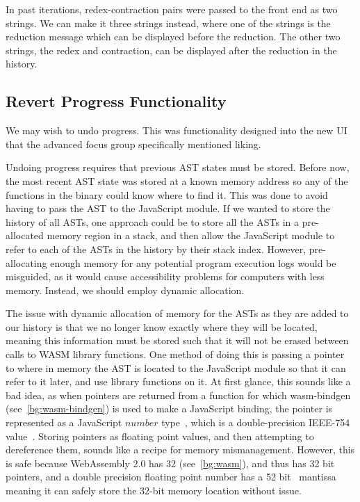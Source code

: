 In past iterations, redex-contraction pairs were passed to the front end as two strings. We can make it three strings instead, where one of the strings is the reduction message which can be displayed before the reduction. The other two strings, the redex and contraction, can be displayed after the reduction in the history. 

\subsection{Revert Progress Functionality}
We may wish to undo progress. This was functionality designed into the new UI that the advanced focus group specifically mentioned liking. 

Undoing progress requires that previous \ac{AST} states must be stored. Before now, the most recent \ac{AST} state was stored at a known memory address so any of the functions in the binary could know where to find it. This was done to avoid having to pass the \ac{AST} to the JavaScript module. If we wanted to store the history of all \ac{AST}s, one approach could be to store all the \ac{AST}s in a pre-allocated memory region in a stack, and then allow the JavaScript module to refer to each of the \ac{AST}s in the history by their stack index. However, pre-allocating enough memory for any potential program execution logs would be misguided, as it would cause accessibility problems for computers with less memory. Instead, we should employ dynamic allocation. 

The issue with dynamic allocation of memory for the \ac{AST}s as they are added to our history is that we no longer know exactly where they will be located, meaning this information must be stored such that it will not be erased between calls to \ac{WASM} library functions. One method of doing this is passing a pointer to where in memory the \ac{AST} is located to the JavaScript module so that it can refer to it later, and use library functions on it. At first glance, this sounds like a bad idea, as when pointers are returned from a function for which wasm-bindgen (see~\ref{bg:wasm-bindgen}) is used to make a JavaScript binding, the pointer is represented as a JavaScript $number$ type~\cite{wasm_bindgen_guide}, which is a double-precision IEEE-754 value~\cite{ecma262number}. Storing pointers as floating point values, and then attempting to dereference them, sounds like a recipe for memory mismanagement. However, this is safe because WebAssembly 2.0 has 32 (see~\ref{bg:wasm}), and thus has 32 bit pointers, and a double precision floating point number has a 52 bit~\cite{ieee754} mantissa meaning it can safely store the 32-bit memory location without issue. 

